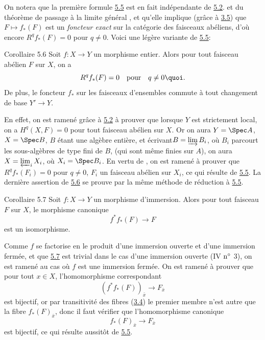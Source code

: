 \documentclass[10pt]{../fichiers-configuration-latex/smfart}
\begin{document}
On notera que la première formule \hyperref[VIII.prop5.5]{5.5} est en fait
indépendante de \hyperref[VIII.thm5.2]{5.2}. et du théorème de passage à la
limite général , et qu'elle implique (grâce à
\hyperref[VIII.thm3.5]{3.5}) que $F \mapsto f_{\ast} (F)$ est un
\emph{foncteur exact} sur la catégorie des faisceaux abéliens, d'où
encore $R^q f_{\ast} (F) = 0$ pour $q \neq 0$. Voici une légère
variante de \hyperref[VIII.prop5.5]{5.5}:

\begin{enonce*}{Corollaire 5.6}
Soit $f : X \to Y$ un morphisme entier. Alors pour tout faisceau
abélien $F$ sur $X$, on a
$$
R^q f_{\ast} (F) = 0\quad \mbox{pour}\quad q \neq 0{\quoi}.
$$
De plus, le foncteur $f_{\ast}$ sur les faisceaux d'ensembles commute
à tout changement de base $Y'\to Y$.
\end{enonce*}

En effet, on est ramené grâce à \hyperref[VIII.thm5.2]{5.2} à prouver que lorsque $Y$ est
strictement local, on a $H^q(X, F) = 0$ pour tout faisceau abélien sur
$X$. Or on aura $Y = \Spec A$, $X = \Spec B$, $B$ étant une algèbre
entière, et écrivant\pageoriginale $B = \varinjlim B_i$, où
$B_i$ parcourt les
sous-algèbres de type fini de $B$, (qui sont même finies sur $A$), on
aura $X = \varprojlim_{i} X_i$, où $X_i = \Spec B_i$. En vertu
de , on est ramené à prouver que $R^{q} f_{\ast} (F_i) = 0$
pour $q \neq 0$, $F_i$ un faisceau abélien sur $X_i$, ce qui résulte
de \hyperref[VIII.prop5.5]{5.5}. La dernière assertion de \hyperref[VIII.cor5.6]{5.6} se
prouve par la même méthode de
réduction à \hyperref[VIII.prop5.5]{5.5}.

\begin{enonce*}{Corollaire 5.7}
Soit $f : X \to Y$ un morphisme d'immersion. Alors pour tout faisceau
$F$ sur $X$, le morphisme canonique
$$
f^{\ast} f_{\ast} (F) \to F
$$
est un isomorphisme.
\end{enonce*}

Comme $f$ se factorise en le produit d'une immersion ouverte et
d'une immersion fermée, et que \hyperref[VIII.cor5.7]{5.7} est trivial dans le
cas d'une immersion ouverte (IV ${\rm n^{\circ}}$ 3), on est ramené
au cas où $f$ est une immersion fermée. On est ramené à prouver que
pour tout $x \in X$, l'homomorphisme correspondant
$$
(f^{\ast} f_{\ast}(F))_{\bar{x}} \to F_{\bar{x}}
$$
est bijectif, or par transitivité des fibres (\hyperref[VIII.subsec3.4]{3.4})
le premier membre
n'est autre que la fibre $f_{\ast} (F)_{\bar{x}}$, donc il faut
vérifier que l'homomorphisme canonique
$$
f_{\ast} (F)_{\bar{x}} \to F_{\bar{x}}
$$
est bijectif, ce qui résulte aussitôt de \hyperref[VIII.prop5.5]{5.5}.
\end{document}
